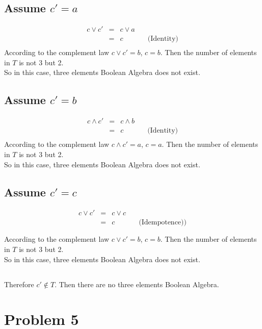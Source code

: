\documentclass{article} %
\begin{document}
\subsection*{Assume $c' = a$}
\[\begin{array}{rllr}
    c \vee c'&=& c \vee a\\
                &=& c &\quad\mbox{(Identity)}\\
\end{array}\]
According to the complement law $c \vee c' = b$, $c = b$. Then the number of elements in $T$ is not 3 but 2.\\
So in this case, three elements Boolean Algebra does not exist.\\
\subsection*{Assume $c' = b$}
\[\begin{array}{rllr}
    c \wedge c'  &=& c \wedge b\\
                    &=& c &\quad\mbox{(Identity)}\\
\end{array}\]
According to the complement law $c \wedge c' = a$, $c = a$. Then the number of elements in $T$ is not 3 but 2.\\
So in this case, three elements Boolean Algebra does not exist.\\
\subsection*{Assume $c' = c$}
\[\begin{array}{rllr}
    c \vee c'&=& c \vee c\\
                &=& c &\quad\mbox{(Idempotence))}\\\\
\end{array}\]
According to the complement law $c \vee c' = b$, $c = b$. Then the number of elements in $T$ is not 3 but 2.\\
So in this case, three elements Boolean Algebra does not exist.\\
\subsection*{}
Therefore $c' \notin T$. Then there are no three elements Boolean Algebra.\\
\section*{Problem 5}
\end{document}
